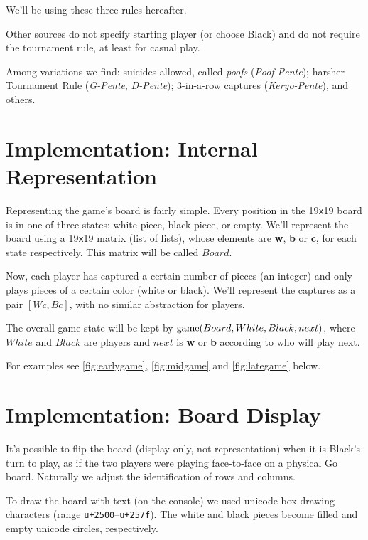\documentclass[12pt,a4paper,notitlepage]{article}
\newcommand*{\boardsize}[1]{#1\texttt{x}#1}
\begin{document}
We'll be using these three rules hereafter.

Other sources do not specify starting player (or choose Black) and do not require the tournament rule, at least for casual play. 

Among variations we find: suicides allowed, called \textit{poofs} (\textit{Poof-Pente}); harsher Tournament Rule (\textit{G-Pente}, \textit{D-Pente}); 3-in-a-row captures (\textit{Keryo-Pente}), and others.\supercite{pente-org,pente-net}

\section{Implementation: Internal Representation}
\label{sec:internal}

Representing the game's board is fairly simple. Every position in the \boardsize{19} board is in one of three states: white piece, black piece, or empty. We'll represent the board using a \boardsize{19} matrix (list of lists), whose elements are \textbf{w}, \textbf{b} or \textbf{c}, for each state respectively. This matrix will be called $Board$.

Now, each player has captured a certain number of pieces (an integer) and only plays pieces of a certain color (white or black). We'll represent the captures as a pair $[Wc,Bc]$, with no similar abstraction for players.

The overall game state will be kept by $\textup{game}(Board, White, Black, next)$, where $White$ and $Black$ are players and $next$ is \textbf{w} or \textbf{b} according to who will play next.

For examples see \autoref{fig:earlygame}, \autoref{fig:midgame} and \autoref{fig:lategame} below.

\section{Implementation: Board Display}
\label{sec:boarddisplay}

It's possible to flip the board (display only, not representation) when it is Black's turn to play, as if the two players were playing face-to-face on a physical Go board. Naturally we adjust the identification of rows and columns.

To draw the board with text (on the console) we used unicode box-drawing characters (range \texttt{u+2500}--\texttt{u+257f}). The white and black pieces become filled and empty unicode circles, respectively.
\end{document}
